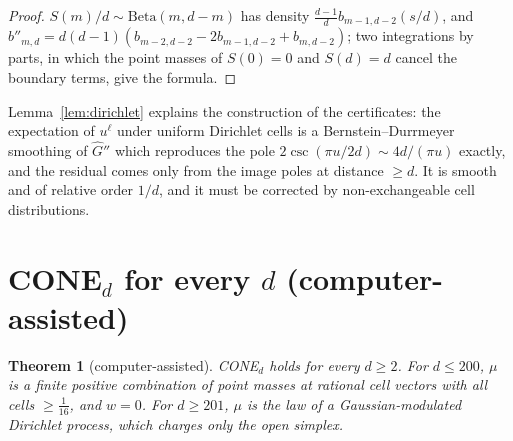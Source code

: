\documentclass[11pt]{amsart}
\newtheorem{theorem}{Theorem}[section]
\theoremstyle{definition}
\theoremstyle{remark}
\numberwithin{equation}{section}
\begin{document}
\begin{proof}
$S(m)/d\sim\mathrm{Beta}(m,d-m)$ has density $\frac{d-1}{d}b_{m-1,d-2}(s/d)$, and
$b''_{m,d}=d(d-1)(b_{m-2,d-2}-2b_{m-1,d-2}+b_{m,d-2})$; two integrations by parts, in which the point masses of $S(0)=0$
and $S(d)=d$ cancel the boundary terms, give the formula.
\end{proof}

Lemma~\ref{lem:dirichlet} explains the construction of the certificates: the expectation of $u^\ell$ under uniform
Dirichlet cells is a Bernstein--Durrmeyer smoothing of $\hat G''$ which reproduces the pole $2\csc(\pi u/2d)\sim4d/(\pi u)$
exactly, and the residual comes only from the image poles at distance $\ge d$. It is smooth and of relative order $1/d$,
and it must be corrected by non-exchangeable cell distributions.

\section{\texorpdfstring{CONE$_d$ for every $d$}{CONE(d) for every d} (computer-assisted)}\label{sec:cone}

\begin{theorem}[computer-assisted]\label{thm:cone}
CONE$_d$ holds for every $d\ge2$. For $d\le200$, $\mu$ is a finite positive combination of point masses at rational
cell vectors with all cells $\ge\frac1{16}$, and $w=0$. For $d\ge201$, $\mu$ is the law of a Gaussian-modulated
Dirichlet process, which charges only the open simplex.
\end{theorem}
\end{document}
